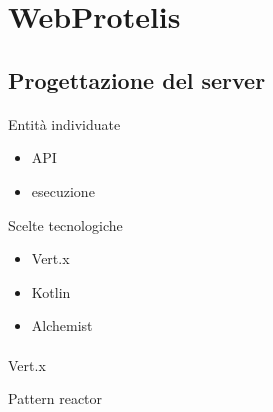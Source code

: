 \documentclass[
  usepdftitle=false,  %
  bigger,               %
  lualatex,           %
  italian             %
]{beamer}
\begin{document}
  \section{WebProtelis}

    \subsection{Progettazione del server}
      \begin{frame}{\insertsectionhead}
        \framesubtitle{\insertsubsectionhead}

        \begin{block}{Entità individuate}
          \begin{itemize}
            \item API         %
            \item esecuzione  %
          \end{itemize}
        \end{block}

        \begin{block}{Scelte tecnologiche}
          \begin{itemize}
            \item Vert.x      %
            \item Kotlin      %
            \item Alchemist   %
          \end{itemize}
        \end{block}
      \end{frame}

      \begin{frame}{\insertsectionhead}
        \framesubtitle{\insertsubsectionhead}

        \begin{block}{Vert.x}
        \end{block}


        \begin{block}{Pattern reactor}
        \end{block}
      \end{frame}
\end{document}
